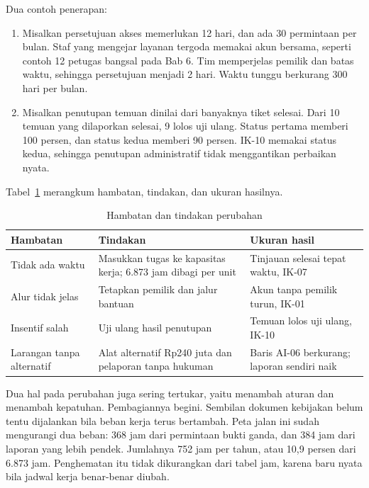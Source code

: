 Dua contoh penerapan:
\begin{enumerate}
  \item Misalkan persetujuan akses memerlukan 12 hari, dan ada 30 permintaan per bulan. Staf yang
  mengejar layanan tergoda memakai akun bersama, seperti contoh 12 petugas bangsal pada Bab 6. Tim
  memperjelas pemilik dan batas waktu, sehingga persetujuan menjadi 2 hari. Waktu tunggu berkurang
  300 hari per bulan.
  \item Misalkan penutupan temuan dinilai dari banyaknya tiket selesai. Dari 10 temuan yang
  dilaporkan selesai, 9 lolos uji ulang. Status pertama memberi 100 persen, dan status kedua memberi
  90 persen. IK-10 memakai status kedua, sehingga penutupan administratif tidak menggantikan
  perbaikan nyata.
\end{enumerate}

Tabel~\ref{tab:ch14-perubahan} merangkum hambatan, tindakan, dan ukuran hasilnya.

\begin{table}[!htb]
  \centering\small
  \caption{Hambatan dan tindakan perubahan}\label{tab:ch14-perubahan}
  \begin{tabularx}{\textwidth}{|>{\raggedright\arraybackslash}X|>{\raggedright\arraybackslash}X|>{\raggedright\arraybackslash}X|}
    \hline
    \textbf{Hambatan} & \textbf{Tindakan} & \textbf{Ukuran hasil} \\ \hline
    Tidak ada waktu & Masukkan tugas ke kapasitas kerja; 6.873 jam dibagi per unit & Tinjauan
    selesai tepat waktu, IK-07 \\ \hline
    Alur tidak jelas & Tetapkan pemilik dan jalur bantuan & Akun tanpa pemilik turun, IK-01 \\
    \hline
    Insentif salah & Uji ulang hasil penutupan & Temuan lolos uji ulang, IK-10 \\ \hline
    Larangan tanpa alternatif & Alat alternatif Rp240 juta dan pelaporan tanpa hukuman & Baris
    AI-06 berkurang; laporan sendiri naik \\ \hline
  \end{tabularx}
\end{table}

Dua hal pada perubahan juga sering tertukar, yaitu menambah aturan dan menambah kepatuhan.
Pembagiannya begini. Sembilan dokumen kebijakan belum tentu dijalankan bila beban kerja terus
bertambah. Peta jalan ini sudah mengurangi dua beban: 368 jam dari permintaan bukti ganda, dan 384
jam dari laporan yang lebih pendek. Jumlahnya 752 jam per tahun, atau 10,9 persen dari 6.873 jam.
Penghematan itu tidak dikurangkan dari tabel jam, karena baru nyata bila jadwal kerja benar-benar
diubah.

